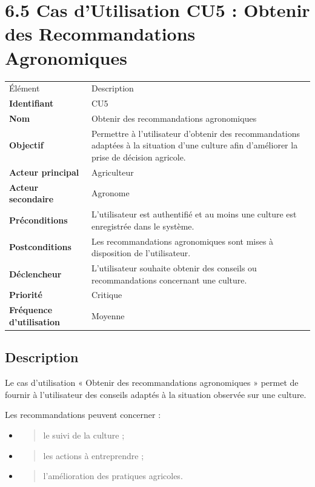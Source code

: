 \documentclass[
]{book}
\begin{document}
\hypertarget{cas-dutilisation-cu5-obtenir-des-recommandations-agronomiques}{%
\section{6.5 Cas d'Utilisation CU5 : Obtenir des Recommandations
Agronomiques}\label{cas-dutilisation-cu5-obtenir-des-recommandations-agronomiques}}

\begin{longtable}[]{@{}ll@{}}
\toprule
\endhead
Élément & Description \\
\textbf{Identifiant} & CU5 \\
\textbf{Nom} & Obtenir des recommandations agronomiques \\
\textbf{Objectif} & Permettre à l'utilisateur d'obtenir des
recommandations adaptées à la situation d'une culture afin d'améliorer
la prise de décision agricole. \\
\textbf{Acteur principal} & Agriculteur \\
\textbf{Acteur secondaire} & Agronome \\
\textbf{Préconditions} & L'utilisateur est authentifié et au moins une
culture est enregistrée dans le système. \\
\textbf{Postconditions} & Les recommandations agronomiques sont mises à
disposition de l'utilisateur. \\
\textbf{Déclencheur} & L'utilisateur souhaite obtenir des conseils ou
recommandations concernant une culture. \\
\textbf{Priorité} & Critique \\
\textbf{Fréquence d'utilisation} & Moyenne \\
\bottomrule
\end{longtable}

\hypertarget{description-3}{%
\subsection{Description}\label{description-3}}

Le cas d'utilisation « Obtenir des recommandations agronomiques » permet
de fournir à l'utilisateur des conseils adaptés à la situation observée
sur une culture.

Les recommandations peuvent concerner :

\begin{itemize}
\item
  \begin{quote}
  le suivi de la culture ;
  \end{quote}
\item
  \begin{quote}
  les actions à entreprendre ;
  \end{quote}
\item
  \begin{quote}
  l'amélioration des pratiques agricoles.
  \end{quote}
\end{itemize}
\end{document}
